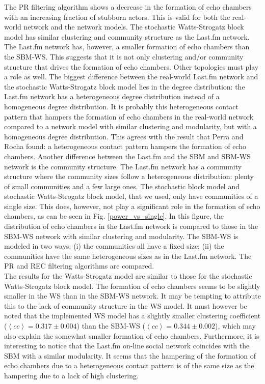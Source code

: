 \documentclass[11 pt , letterpaper , twoside , openright]{book}
\begin{document}
The PR filtering algorithm shows a decrease in the formation of echo chambers with an increasing fraction of stubborn actors. This is valid for both the real-world network and the network models. The stochastic Watts-Strogatz block model has similar clustering and community structure as the Last.fm network. The Last.fm network has, however, a smaller formation of echo chambers than the SBM-WS. This suggests that it is not only clustering and/or community structure that drives the formation of echo chambers. Other topologies must play a role as well. The biggest difference between the real-world Last.fm network and the stochastic Watts-Strogatz block model lies in the degree distribution: the Last.fm network has a heterogeneous degree distribution instead of a homogeneous degree distribution. It is probably this heterogeneous contact pattern that hampers the formation of echo chambers in the real-world network compared to a network model with similar clustering and modularity, but with a homogeneous degree distribution. This agrees with the result that Perra and Rocha \cite{Perra2019} found: a heterogeneous contact pattern hampers the formation of echo chambers. Another difference between the Last.fm and the SBM and SBM-WS network is the community structure. The Last.fm network has a community structure where the community sizes follow a heterogeneous distribution: plenty of small communities and a few large ones. The stochastic block model and stochastic Watts-Strogatz block model, that we used, only have communities of a single size. This does, however, not play a significant role in the formation of echo chambers, as can be seen in Fig. \ref{power_vs_single}. In this figure, the distribution of echo chambers in the Last.fm network is compared to those in the SBM-WS network with similar clustering and modularity. The SBM-WS is modeled in two ways: (i) the communities all have a fixed size; (ii) the communities have the same heterogeneous sizes as in the Last.fm network. The PR and REC filtering algorithms are compared.\\ %
\newpage
\noindent
The results for the Watts-Strogatz model are similar to those for the stochastic Watts-Strogatz block model. The formation of echo chambers seems to be slightly smaller in the WS than in the SBM-WS network. It may be tempting to attribute this to the lack of community structure in the WS model. It must however be noted that the implemented WS model has a slightly smaller clustering coefficient ($\left<cc\right> = 0.317 \pm 0.004$) than the SBM-WS ($\left<cc\right> = 0.344 \pm 0.002$), which may also explain the somewhat smaller formation of echo chambers. Furthermore, it is interesting to notice that the Last.fm on-line social network coincides with the SBM with a similar modularity. It seems that the hampering of the formation of echo chambers due to a heterogeneous contact pattern is of the same size as the hampering due to a lack of high clustering. %
\end{document}
